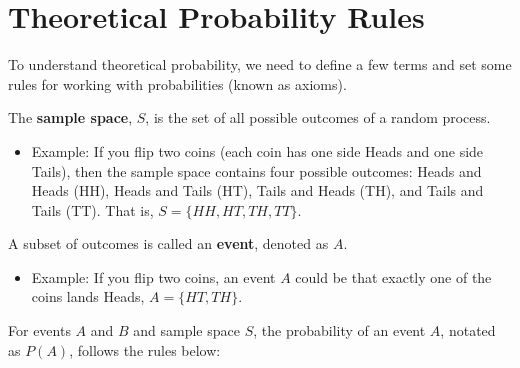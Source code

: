 \documentclass[]{book}
\providecommand{\tightlist}{%
  \setlength{\itemsep}{0pt}\setlength{\parskip}{0pt}}
\begin{document}
\hypertarget{theoretical-probability-rules}{%
\section{Theoretical Probability Rules}\label{theoretical-probability-rules}}

To understand theoretical probability, we need to define a few terms and set some rules for working with probabilities (known as axioms).

The \textbf{sample space}, \(S\), is the set of all possible outcomes of a random process.

\begin{itemize}
\tightlist
\item
  Example: If you flip two coins (each coin has one side Heads and one side Tails), then the sample space contains four possible outcomes: Heads and Heads (HH), Heads and Tails (HT), Tails and Heads (TH), and Tails and Tails (TT). That is, \(S = \{HH,HT,TH,TT\}\).
\end{itemize}

A subset of outcomes is called an \textbf{event}, denoted as \(A\).

\begin{itemize}
\tightlist
\item
  Example: If you flip two coins, an event \(A\) could be that exactly one of the coins lands Heads, \(A = \{HT,TH\}\).
\end{itemize}

For events \(A\) and \(B\) and sample space \(S\), the probability of an event \(A\), notated as \(P(A)\), follows the rules below:
\end{document}
